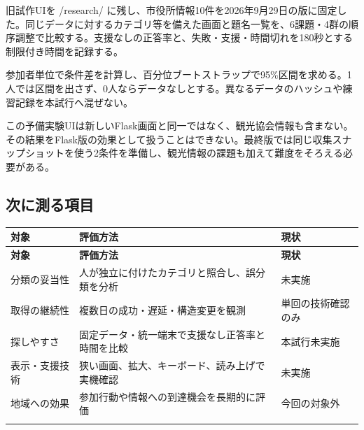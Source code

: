 \documentclass[a4paper,10pt]{ltjsarticle}
\begin{document}
旧試作UIを /research/ に残し、市役所情報10件を2026年9月29日の版に固定した。同じデータに対するカテゴリ等を備えた画面と題名一覧を、6課題・4群の順序調整で比較する。支援なしの正答率と、失敗・支援・時間切れを180秒とする制限付き時間を記録する。


参加者単位で条件差を計算し、百分位ブートストラップで95\%区間を求める。1人では区間を出さず、0人ならデータなしとする。異なるデータのハッシュや練習記録を本試行へ混ぜない。


この予備実験UIは新しいFlask画面と同一ではなく、観光協会情報も含まない。その結果をFlask版の効果として扱うことはできない。最終版では同じ収集スナップショットを使う2条件を準備し、観光情報の課題も加えて難度をそろえる必要がある。


\subsection*{次に測る項目}

{\small\begin{longtable}{@{}>{\raggedright\arraybackslash}p{}>{\raggedright\arraybackslash}p{}>{\raggedright\arraybackslash}p{}@{}}

\rowcolor{Pale}\textbf{対象} & \textbf{評価方法} & \textbf{現状} \\ \midrule

\endfirsthead

\rowcolor{Pale}\textbf{対象} & \textbf{評価方法} & \textbf{現状} \\ \midrule\endhead

分類の妥当性 & 人が独立に付けたカテゴリと照合し、誤分類を分析 & 未実施 \\ \addlinespace[3pt]

取得の継続性 & 複数日の成功・遅延・構造変更を観測 & 単回の技術確認のみ \\ \addlinespace[3pt]

探しやすさ & 固定データ・統一端末で支援なし正答率と時間を比較 & 本試行未実施 \\ \addlinespace[3pt]

表示・支援技術 & 狭い画面、拡大、キーボード、読み上げで実機確認 & 未実施 \\ \addlinespace[3pt]

地域への効果 & 参加行動や情報への到達機会を長期的に評価 & 今回の対象外 \\ \addlinespace[3pt]

\bottomrule\end{longtable}}
\end{document}
